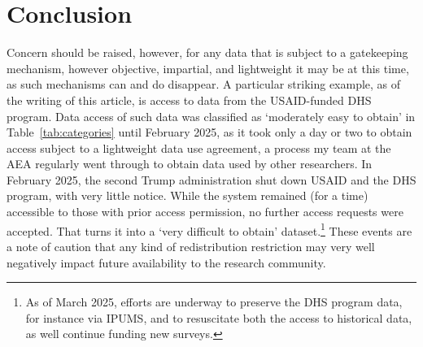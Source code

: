 \documentclass{article}
\begin{document}
\section{Conclusion}



Concern should be raised, however, for any data that is subject to a gatekeeping mechanism, however objective, impartial, and lightweight it may be at this time, as such mechanisms can and do disappear.  A particular striking example, as of the writing of this article, is access to data from the USAID-funded \ac{DHS} program. Data access of such data was classified as `moderately easy to obtain' in Table~\ref{tab:categories} until February 2025, as it took only a day or two to obtain access subject to a lightweight data use agreement, a process my team at the AEA regularly went through to obtain data used by other researchers. In February 2025, the second Trump administration shut down USAID and the DHS program, with very little notice. While the system remained (for a time) accessible to those with prior access permission, no further access requests were accepted. That turns it into a `very difficult to obtain' dataset.\footnote{As of March 2025, efforts are underway to preserve the DHS program data, for instance via IPUMS, and to resuscitate both the access to historical data, as well continue funding new surveys.} These events are a note of caution that any kind of redistribution restriction may very well negatively impact future availability to the research community.


\printbibliography[title={References}]

\appendix
\appendixpage


\end{document}
